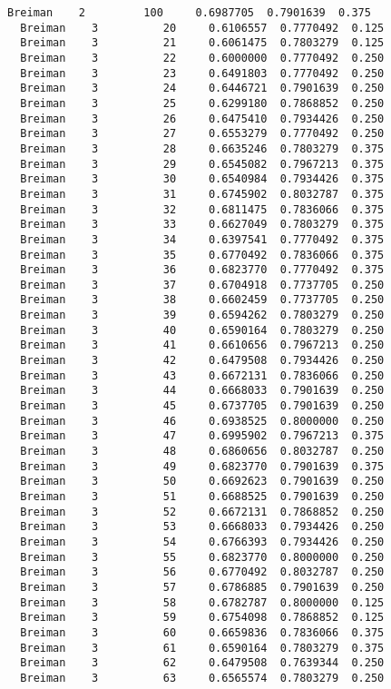 \documentclass[11pt]{article}
\begin{document}
\begin{Verbatim}[commandchars=\\\{\}]
  Breiman    2         100     0.6987705  0.7901639  0.375
  Breiman    3          20     0.6106557  0.7770492  0.125
  Breiman    3          21     0.6061475  0.7803279  0.125
  Breiman    3          22     0.6000000  0.7770492  0.250
  Breiman    3          23     0.6491803  0.7770492  0.250
  Breiman    3          24     0.6446721  0.7901639  0.250
  Breiman    3          25     0.6299180  0.7868852  0.250
  Breiman    3          26     0.6475410  0.7934426  0.250
  Breiman    3          27     0.6553279  0.7770492  0.250
  Breiman    3          28     0.6635246  0.7803279  0.375
  Breiman    3          29     0.6545082  0.7967213  0.375
  Breiman    3          30     0.6540984  0.7934426  0.375
  Breiman    3          31     0.6745902  0.8032787  0.375
  Breiman    3          32     0.6811475  0.7836066  0.375
  Breiman    3          33     0.6627049  0.7803279  0.375
  Breiman    3          34     0.6397541  0.7770492  0.375
  Breiman    3          35     0.6770492  0.7836066  0.375
  Breiman    3          36     0.6823770  0.7770492  0.375
  Breiman    3          37     0.6704918  0.7737705  0.250
  Breiman    3          38     0.6602459  0.7737705  0.250
  Breiman    3          39     0.6594262  0.7803279  0.250
  Breiman    3          40     0.6590164  0.7803279  0.250
  Breiman    3          41     0.6610656  0.7967213  0.250
  Breiman    3          42     0.6479508  0.7934426  0.250
  Breiman    3          43     0.6672131  0.7836066  0.250
  Breiman    3          44     0.6668033  0.7901639  0.250
  Breiman    3          45     0.6737705  0.7901639  0.250
  Breiman    3          46     0.6938525  0.8000000  0.250
  Breiman    3          47     0.6995902  0.7967213  0.375
  Breiman    3          48     0.6860656  0.8032787  0.250
  Breiman    3          49     0.6823770  0.7901639  0.375
  Breiman    3          50     0.6692623  0.7901639  0.250
  Breiman    3          51     0.6688525  0.7901639  0.250
  Breiman    3          52     0.6672131  0.7868852  0.250
  Breiman    3          53     0.6668033  0.7934426  0.250
  Breiman    3          54     0.6766393  0.7934426  0.250
  Breiman    3          55     0.6823770  0.8000000  0.250
  Breiman    3          56     0.6770492  0.8032787  0.250
  Breiman    3          57     0.6786885  0.7901639  0.250
  Breiman    3          58     0.6782787  0.8000000  0.125
  Breiman    3          59     0.6754098  0.7868852  0.125
  Breiman    3          60     0.6659836  0.7836066  0.375
  Breiman    3          61     0.6590164  0.7803279  0.375
  Breiman    3          62     0.6479508  0.7639344  0.250
  Breiman    3          63     0.6565574  0.7803279  0.250

\end{Verbatim}
\end{document}
